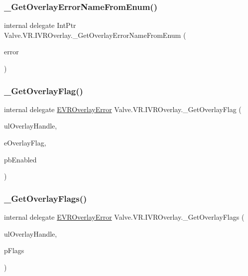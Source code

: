 \subsubsection{\texorpdfstring{\_GetOverlayErrorNameFromEnum()}{\_GetOverlayErrorNameFromEnum()}}
{\footnotesize\ttfamily internal delegate Int\+Ptr Valve.\+V\+R.\+I\+V\+R\+Overlay.\+\_\+\+Get\+Overlay\+Error\+Name\+From\+Enum (\begin{DoxyParamCaption}\item[{\mbox{\hyperlink{namespace_valve_1_1_v_r_aaee5c5144f42b7969d45b854f51b0c18}{E\+V\+R\+Overlay\+Error}}}]{error }\end{DoxyParamCaption})}

\mbox{\label{struct_valve_1_1_v_r_1_1_i_v_r_overlay_ae8d49da4f9a47a988edc9492f9e92831}} 
\subsubsection{\texorpdfstring{\_GetOverlayFlag()}{\_GetOverlayFlag()}}
{\footnotesize\ttfamily internal delegate \mbox{\hyperlink{namespace_valve_1_1_v_r_aaee5c5144f42b7969d45b854f51b0c18}{E\+V\+R\+Overlay\+Error}} Valve.\+V\+R.\+I\+V\+R\+Overlay.\+\_\+\+Get\+Overlay\+Flag (\begin{DoxyParamCaption}\item[{ulong}]{ul\+Overlay\+Handle,  }\item[{\mbox{\hyperlink{namespace_valve_1_1_v_r_a34c8e00ad63b95c5f533b1387bcab6ff}{V\+R\+Overlay\+Flags}}}]{e\+Overlay\+Flag,  }\item[{ref bool}]{pb\+Enabled }\end{DoxyParamCaption})}

\mbox{\label{struct_valve_1_1_v_r_1_1_i_v_r_overlay_a0706f71c80fe30f2327615ff966bdd66}} 
\subsubsection{\texorpdfstring{\_GetOverlayFlags()}{\_GetOverlayFlags()}}
{\footnotesize\ttfamily internal delegate \mbox{\hyperlink{namespace_valve_1_1_v_r_aaee5c5144f42b7969d45b854f51b0c18}{E\+V\+R\+Overlay\+Error}} Valve.\+V\+R.\+I\+V\+R\+Overlay.\+\_\+\+Get\+Overlay\+Flags (\begin{DoxyParamCaption}\item[{ulong}]{ul\+Overlay\+Handle,  }\item[{ref uint}]{p\+Flags }\end{DoxyParamCaption})}

